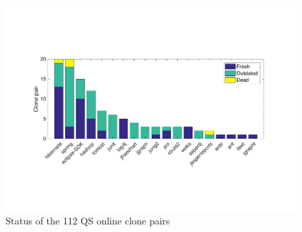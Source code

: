 \documentclass[sigconf,review, anonymous]{acmart}
\begin{document}
\begin{figure}
	\centering
	\includegraphics[width=\linewidth]{freshness}
	\caption{Status of the 112 QS online clone pairs}
	\label{fig:outdated}
\end{figure}
\end{document}
